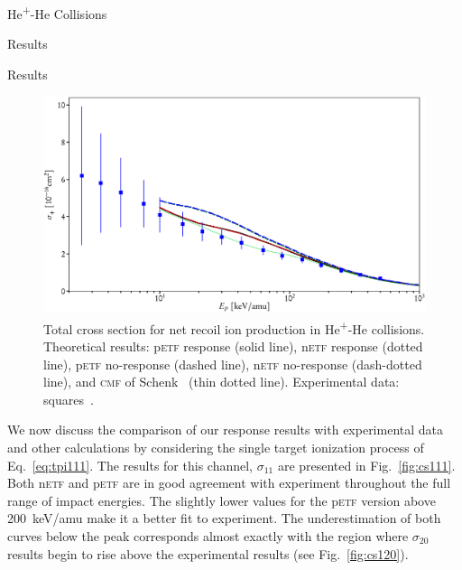 \documentclass[letterpaper, 11 pt]{report}
\begin{document}
\begin{chapter}{\texorpdfstring{He\textsuperscript{+}}{He+}-He Collisions \label{chap:hephe}}
\begin{section}{Results \label{sec:hephe-disc}}
\begin{subsection}{Results \label{sec:hephe-res}}
         \begin{figure}[t]
            \centering
            \includegraphics[width = \linewidth]{./images/hephe-cross/netRecoil.eps}
            \caption[Total cross section for net recoil ion production in He\textsuperscript{+}-He
                     collisions.]
                    {Total cross section for net recoil ion production in He\textsuperscript{+}-He
                     collisions.
                     Theoretical results: p\textsc{etf} response (solid line), n\textsc{etf} response
                                          (dotted line), p\textsc{etf} no-response (dashed line),
                                          n\textsc{etf} no-response (dash-dotted line), and
                                          \textsc{cmf} of Schenk~\cite{geraldDiss}
                                          (thin dotted line).
                     Experimental data: squares~\cite{RGID85}. \label{fig:recoil}}
         \end{figure}

         We now discuss the comparison of our response results with experimental data and other
         calculations by considering the single target ionization process of Eq.~\eqref{eq:tpi111}. The
         results for this channel, $\sigma_{11}$ are presented in Fig.~\ref{fig:cs111}. Both
         n\textsc{etf} and p\textsc{etf} are in good agreement with experiment throughout the full range
         of impact energies. The slightly lower values for the p\textsc{etf} version above 200~keV/amu
         make it a better fit to experiment. The underestimation of both curves below the peak
         corresponds almost exactly with the region where $\sigma_{20}$ results begin to rise above the
         experimental results (see Fig.~\ref{fig:cs120}).


\end{subsection}
\end{section}
\end{chapter}
\end{document}
